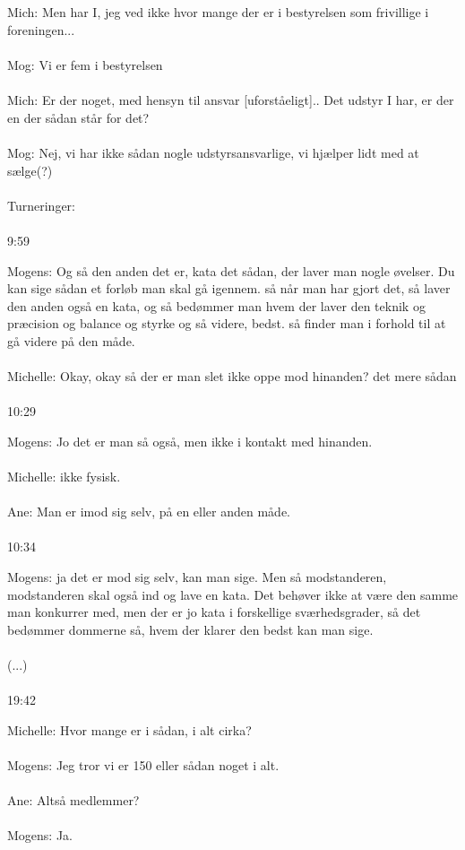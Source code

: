 \\\\
Mich: Men har I, jeg ved ikke hvor mange der er i bestyrelsen som frivillige i foreningen...
\\\\
Mog: Vi er fem i bestyrelsen
\\\\
Mich: Er der noget, med hensyn til ansvar [uforståeligt].. 
Det udstyr I har, er der en der sådan står for det?
\\\\
Mog: Nej, vi har ikke sådan nogle udstyrsansvarlige, vi hjælper lidt med at sælge(?) 
\\\\
Turneringer:
\\\\
9:59
\par
Mogens: Og så den anden det er, kata det sådan, der laver man nogle øvelser. Du kan sige sådan et forløb man skal gå igennem. så når man har gjort det, så laver den anden også en kata, og så bedømmer man hvem der laver den teknik og præcision og balance og styrke og så videre, bedst. så finder man i forhold til at gå videre på den måde.
\\\\
Michelle: Okay, okay så der er man slet ikke oppe mod hinanden? det mere sådan
\\\\
10:29
\par
Mogens: Jo det er man så også, men ikke i kontakt med hinanden.
\\\\
Michelle: ikke fysisk.
\\\\
Ane: Man er imod sig selv, på en eller anden måde.
\\\\
10:34
\par
Mogens: ja det er mod sig selv, kan man sige. Men så modstanderen, modstanderen skal også ind og lave en kata. Det behøver ikke at være den samme man konkurrer med, men der er jo kata i forskellige sværhedsgrader, så det bedømmer dommerne så, hvem der klarer den bedst kan man sige. 
\\\\
(...)
\\\\
19:42
\par
Michelle: Hvor mange er i sådan, i alt cirka?
\\\\
Mogens: Jeg tror vi er 150 eller sådan noget i alt. 
\\\\
Ane: Altså medlemmer?
\\\\
Mogens: Ja. 